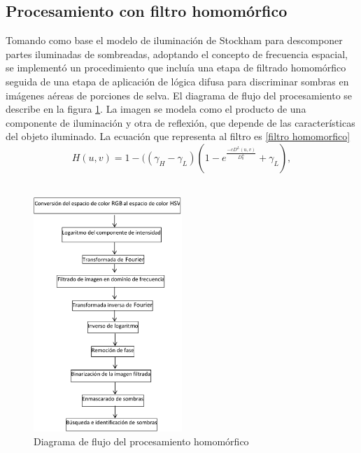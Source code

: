 \subsection{Procesamiento con filtro homomórfico} \label{Metodo homomorfico}
Tomando como base el modelo de iluminación de Stockham para descomponer partes iluminadas de sombreadas, adoptando el concepto de frecuencia espacial, se implementó un procedimiento que incluía una etapa de filtrado homomórfico seguida de una etapa de aplicación de lógica difusa para discriminar sombras en imágenes aéreas de porciones de selva. El diagrama de flujo del procesamiento se describe en la figura \ref{flowchart_homomorfico}.
La imagen se modela como el producto de una componente de iluminación y otra de reflexión, que depende de las características del objeto iluminado. 
La ecuación que representa al filtro es \ref{filtro homomorfico}
\\
\begin{equation}
	H(u,v)=1-((\gamma_H-\gamma_L)(1-e^{\frac{-cD^L(u,v)}{D^L_0}}+\gamma_L),\label{filtro homomorfico}
\end{equation}
\\
\begin{figure}[h!]
    \centering
    \includegraphics[width=0.5\textwidth]{Imagenes/Homomorfico/flowchart.png}
     \hfill
     \caption{Diagrama de flujo del procesamiento homomórfico}
    \label{flowchart_homomorfico}
\end{figure}

